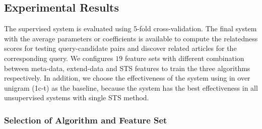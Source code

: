 \subsection{Experimental Results}
\label{sec:6.4}

The supervised system is evaluated using 5-fold cross-validation. The final system with the average parameters or coefficients is available to compute the relatedness scores for testing query-candidate pairs and discover related articles for the corresponding query. We configures $19$ feature sets with different combination between meta-data, extend-data and STS features to train the three algorithms  respectively. In addition, we choose the effectiveness of the system using \tfidf{} in \icontent{} over unigram (1c-t) as the baseline, because the system has the best effectiveness in all unsupervised systems with single STS method. 

\subsubsection{Selection of Algorithm and Feature Set}

